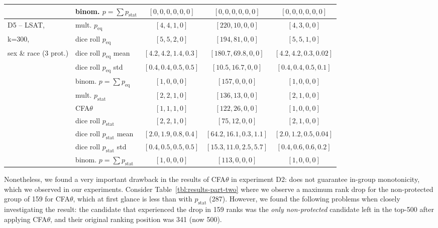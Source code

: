 \begin{table}[t!]
{\begin{tabular}{llccc}
								& binom. \algoFAIR $p = \sum p_{\text{stat}}$	& $[0,0,0, 0,0,0]$		& $[0,0,0, 0,0,0]$	& $[0,0,0, 0,0,0]$ 	 \\	
			\midrule
			\midrule
			D5 -- LSAT, 			& mult. \algoFAIR $p_{\text{eq}}$ 	& $[4, 4, 1, 0]$	& $[220, 10, 0, 0]$ & $[4, 3, 0, 0]$  \\
			k=300, 					& dice roll $p_{\text{eq}}$ 	& $[5, 5, 2, 0]$ & $[194, 81, 0, 0]$ 	& $[5, 5, 1, 0]$ \\
			sex \& race (3 prot.)	& dice roll $p_{\text{eq}}$ mean 	& $[4.2, 4.2, 1.4, 0.3]$ & $[180.7, 69.8, 0, 0]$ 	& $[4.2, 4.2, 0.3, 0.02]$ \\
									& dice roll $p_{\text{eq}}$ std	& $[0.4, 0.4, 0.5, 0.5]$ & $[10.5, 16.7, 0, 0]$ 	& $[0.4, 0.4, 0.5, 0.1]$ \\
								& binom. \algoFAIR $p = \sum p_{\text{eq}}$	& $[1,0,0, 0]$		& $[157,0,0, 0]$		& $[1,0,0, 0]$  \\
									\cline{2-5}
								 	& mult. \algoFAIR $p_{\text{stat}}$ 	& $[2, 2, 1, 0]$ 	& $[136, 13, 0, 0]$ & $[2, 1, 0, 0]$  \\
									& CFA$\theta$ 					& $[1, 1, 1, 0]$ 	& $[122, 26, 0, 0]$ & $[1, 0, 0, 0]$  \\
									& dice roll $p_{\text{stat}}$ 	& $[2, 2, 1, 0]$ & $[75, 12, 0, 0]$ 	& $[2, 1, 0, 0]$ \\
									& dice roll $p_{\text{stat}}$ mean	& $[2.0, 1.9, 0.8, 0.4]$ & $[64.2, 16.1, 0.3, 1.1]$ 	& $[2.0, 1.2, 0.5, 0.04]$ \\
									& dice roll $p_{\text{stat}}$ std	& $[0.4, 0.5, 0.5, 0.5]$ & $[15.3, 11.0, 2.5, 5.7]$ 	& $[0.4, 0.6, 0.6, 0.2]$ \\
								& binom. \algoFAIR $p = \sum p_{\text{stat}}$	& $[1,0,0, 0]$		& $[113,0,0, 0]$		& $[1,0,0, 0]$ 	 \\													
			\bottomrule
		\end{tabular}
	}
\end{table}
%
Nonetheless, we found a very important drawback in the results of CFA$\theta$ in experiment D2: \citet{zehlike2020matching} does not guarantee in-group monotonicity, which we observed in our experiments.
%
Consider Table~\ref{tbl:results-part-two} where we observe a maximum rank drop for the non-protected group of 159 for CFA$\theta$, which at first glance is less than \algoFAIR with $p_{\text{stat}}$ (287).
%
However, we found the following problems when closely investigating the result: the candidate that experienced the drop in 159 ranks was the \emph{only non-protected} candidate left in the top-500 after applying CFA$\theta$, and their original ranking position was 341 (now 500).
